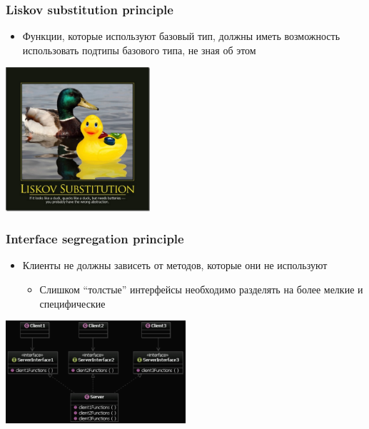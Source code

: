 \documentclass{../cscslides}
\begin{document}
    \begin{frame}
        \frametitle{Liskov substitution principle}
        \begin{itemize}
            \item Функции, которые используют базовый тип, должны иметь возможность использовать подтипы базового типа, не зная об этом
        \end{itemize}
        \begin{flushright}
            \includegraphics[width=0.4\textwidth]{liskovSubstitutionPrinciple.png}
        \end{flushright}
    \end{frame}

    \begin{frame}
        \frametitle{Interface segregation principle}
        \begin{itemize}
            \item Клиенты не должны зависеть от методов, которые они не используют
            \begin{itemize}
                \item Слишком ``толстые'' интерфейсы необходимо разделять на более мелкие и специфические
            \end{itemize}
        \end{itemize}
        \begin{flushright}
            \includegraphics[width=0.5\textwidth]{interfaceSegregationPrincipleBlack.png}
        \end{flushright}
    \end{frame}
\end{document}
